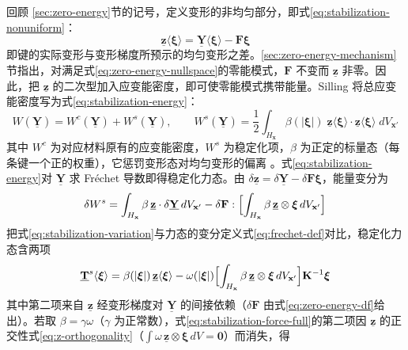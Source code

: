 回顾 \ref{sec:zero-energy}节的记号，定义变形的非均匀部分，即式\eqref{eq:stabilization-nonuniform}：
\begin{equation}
  \underline{\mathbf{z}}\langle\boldsymbol{\xi}\rangle
  =\underline{\mathbf{Y}}\langle\boldsymbol{\xi}\rangle-\mathbf{F}\boldsymbol{\xi}
  \label{eq:stabilization-nonuniform}
\end{equation}
即键的实际变形与变形梯度所预示的均匀变形之差。\ref{sec:zero-energy-mechanism}节指出，对满足式\eqref{eq:zero-energy-nullspace}的零能模式，$\mathbf{F}$ 不变而 $\underline{\mathbf{z}}$ 非零。因此，把 $\underline{\mathbf{z}}$ 的二次型加入应变能密度，即可使零能模式携带能量。Silling 将总应变能密度写为式\eqref{eq:stabilization-energy}：
\begin{equation}
  W(\underline{\mathbf{Y}})=W^{c}(\underline{\mathbf{Y}})+W^{s}(\underline{\mathbf{Y}}),
  \qquad
  W^{s}(\underline{\mathbf{Y}})=\frac{1}{2}\int_{H_{\mathbf{x}}}\beta(|\boldsymbol{\xi}|)\;
  \underline{\mathbf{z}}\langle\boldsymbol{\xi}\rangle\cdot\underline{\mathbf{z}}\langle\boldsymbol{\xi}\rangle\;dV_{\mathbf{x}'}
  \label{eq:stabilization-energy}
\end{equation}
其中 $W^{c}$ 为对应材料原有的应变能密度，$W^{s}$ 为稳定化项，$\beta$ 为正定的标量态（每条键一个正的权重），它惩罚变形态对均匀变形的偏离 \cite{Silling2017}。式\eqref{eq:stabilization-energy}对 $\underline{\mathbf{Y}}$ 求 Fréchet 导数即得稳定化力态。由 $\delta\underline{\mathbf{z}}=\delta\underline{\mathbf{Y}}-\delta\mathbf{F}\boldsymbol{\xi}$，能量变分为
\begin{equation}
  \delta W^{s}
  =\int_{H_{\mathbf{x}}}\beta\,\underline{\mathbf{z}}\cdot\delta\underline{\mathbf{Y}}\,dV_{\mathbf{x}'}
  -\delta\mathbf{F}:\Bigl[\int_{H_{\mathbf{x}}}\beta\,\underline{\mathbf{z}}\otimes\boldsymbol{\xi}\,dV_{\mathbf{x}'}\Bigr]
  \label{eq:stabilization-variation}
\end{equation}
把式\eqref{eq:stabilization-variation}与力态的变分定义式\eqref{eq:frechet-def}对比，稳定化力态含两项
\begin{equation}
  \underline{\mathbf{T}}^{s}\langle\boldsymbol{\xi}\rangle
  =\beta(|\boldsymbol{\xi}|)\,\underline{\mathbf{z}}\langle\boldsymbol{\xi}\rangle
  -\omega(|\boldsymbol{\xi}|)\Bigl[\int_{H_{\mathbf{x}}}\beta\,\underline{\mathbf{z}}\otimes\boldsymbol{\xi}\,dV_{\mathbf{x}'}\Bigr]\mathbf{K}^{-1}\boldsymbol{\xi}
  \label{eq:stabilization-force-full}
\end{equation}
其中第二项来自 $\underline{\mathbf{z}}$ 经变形梯度对 $\underline{\mathbf{Y}}$ 的间接依赖（$\delta\mathbf{F}$ 由式\eqref{eq:zero-energy-df}给出）。若取 $\beta=\gamma\omega$（$\gamma$ 为正常数），式\eqref{eq:stabilization-force-full}的第二项因 $\underline{\mathbf{z}}$ 的正交性式\eqref{eq:z-orthogonality}（$\int\omega\,\underline{\mathbf{z}}\otimes\boldsymbol{\xi}\,dV=\mathbf{0}$）而消失，得
